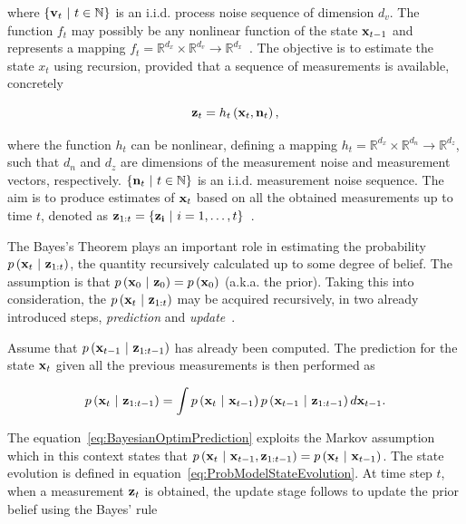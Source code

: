\noindent where $\left\{ {\mathbf{v}_t \ | \ t \in \mathbb{N}} \right\}$ is an i.i.d. process noise sequence of dimension $d_v$. The function $f_t$ may possibly be any nonlinear function of the state $\mathbf{x}_{t - 1}$ and represents a mapping $f_t = \mathbb{R}^{d_x} \times \mathbb{R}^{d_v} \to \mathbb{R}^{d_x}$~\cite{Arulampalam2007}. The objective is to estimate the state $x_t$ using recursion, provided that a sequence of measurements is available, concretely

\begin{equation}
    \mathbf{z}_t = {h_t} \left( \mathbf{x}_t, \mathbf{n}_t \right),
\end{equation}

\noindent where the function $h_t$ can be nonlinear, defining a mapping $h_t = \mathbb{R}^{d_x} \times \mathbb{R}^{d_n} \to \mathbb{R}^{d_z}$, such that $d_n$ and $d_z$ are dimensions of the measurement noise and measurement vectors, respectively. $\left\{ {\mathbf{n}_t \ | \ t \in \mathbb{N}} \right\}$ is an i.i.d. measurement noise sequence. The aim is to produce estimates of $\mathbf{x}_t$ based on all the obtained measurements up to time $t$, denoted as $\mathbf{z}_{1:t} = \left\{ {\mathbf{z_i} \ | \ i = 1, \dots, t} \right\}$~\cite{Arulampalam2007}.

The Bayes's Theorem plays an important role in estimating the probability $p \left( \mathbf{x}_t \ | \ \mathbf{z}_{1:t} \right)$, the quantity recursively calculated up to some degree of belief. The assumption is that $p \left( \mathbf{x}_0 \ | \ \mathbf{z}_0 \right) = p \left( \mathbf{x}_0 \right)$ (a.k.a. the prior). Taking this into consideration, the $p \left( \mathbf{x}_t \ | \ \mathbf{z}_{1:t} \right)$ may be acquired recursively, in two already introduced steps, \emph{prediction} and \emph{update}~\cite{Arulampalam2007}.

Assume that $p \left( \mathbf{x}_{t - 1} \ | \ \mathbf{z}_{1:t - 1} \right)$ has already been computed. The prediction for the state $\mathbf{x}_t$ given all the previous measurements is then performed as

\begin{equation}
    \label{eq:BayesianOptimPrediction}
    p \left( \mathbf{x}_t \ | \ \mathbf{z}_{1:t - 1} \right) = \int p \left( \mathbf{x}_t \ | \ \mathbf{x}_{t - 1} \right) p \left( \mathbf{x}_{t - 1} \ | \ \mathbf{z}_{1:t - 1} \right) d\mathbf{x}_{t - 1}.
\end{equation}

\noindent The equation~\ref{eq:BayesianOptimPrediction} exploits the Markov assumption which in this context states that $p \left( \mathbf{x}_t \ | \ \mathbf{x}_{t - 1}, \mathbf{z}_{1:t - 1} \right) = p \left( \mathbf{x}_t \ | \ \mathbf{x}_{t - 1} \right)$. The state evolution is defined in equation~\ref{eq:ProbModelStateEvolution}. At time step $t$, when a measurement $\mathbf{z}_t$ is obtained, the update stage follows to update the prior belief using the Bayes' rule

